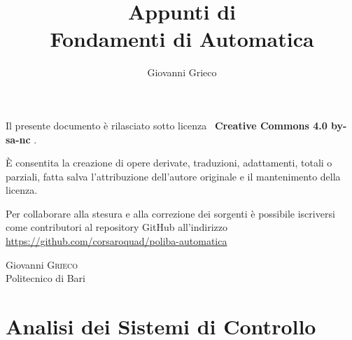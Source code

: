 \documentclass[10pt,a4paper,onecolumn,titlepage,twoside,openright,final]{book}
\title{Appunti di \\ Fondamenti di Automatica}
\subtitle{}
\author{Giovanni Grieco}
\begin{document}

\frontmatter
\maketitle
\newpage

\null
\vfill
Il presente documento è rilasciato sotto licenza \ccLogo\  \textbf{Creative Commons 4.0 by-sa-nc} \ccbyncsa.

È consentita la creazione di opere derivate, traduzioni, adattamenti, totali o parziali,
fatta salva l'attribuzione dell'autore originale e il mantenimento della licenza.

Per collaborare alla stesura e alla correzione dei sorgenti è possibile iscriversi
come contributori al repository GitHub all'indirizzo \url{https://github.com/corsaroquad/poliba-automatica}

Giovanni \textsc{Grieco}\\Politecnico di Bari
\cleardoublepage\clearpage{\pagestyle{empty}\cleardoublepage}

\tableofcontents

\mainmatter
\part{Analisi dei Sistemi di Controllo}




\end{document}
